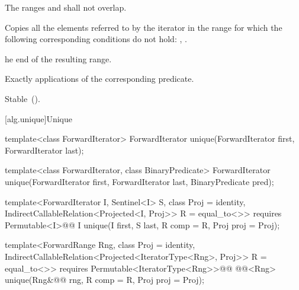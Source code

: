 \begin{itemdescr}
\pnum
\requires
The ranges
and
shall not overlap.

\pnum
\effects
Copies all the elements referred to by the iterator
in the range
for which the following corresponding conditions do not hold:
,
.

\pnum
\returns
{}he end of the resulting range.

\pnum
\complexity
Exactly
applications of the corresponding predicate.

\pnum
\remarks Stable~().
\end{itemdescr}

[alg.unique]{Unique}

%
\begin{removedblock}
\begin{itemdecl}
template<class ForwardIterator>
  ForwardIterator unique(ForwardIterator first, ForwardIterator last);

template<class ForwardIterator, class BinaryPredicate>
  ForwardIterator unique(ForwardIterator first, ForwardIterator last,
                         BinaryPredicate pred);
\end{itemdecl}
\end{removedblock}
\begin{addedblock}
\begin{itemdecl}
template<ForwardIterator I, Sentinel<I> S, class Proj = identity,
    IndirectCallableRelation<Projected<I, Proj>> R = equal_to<>>
  requires Permutable<I>@\newtxt{()}@
  I unique(I first, S last, R comp = R{}, Proj proj = Proj{});

template<ForwardRange Rng, class Proj = identity,
    IndirectCallableRelation<Projected<IteratorType<Rng>, Proj>> R = equal_to<>>
  requires Permutable<IteratorType<Rng>>@\newtxt{()}@
  @@<Rng>
    unique(Rng&@\newtxt{\&}@ rng, R comp = R{}, Proj proj = Proj{});
\end{itemdecl}
\end{addedblock}

